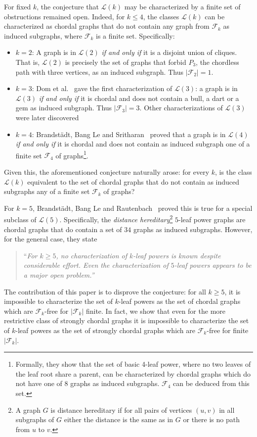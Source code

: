\documentclass[11pt,letter]{article}
\theoremstyle{remark}
\newcommand{\F}{\mathscr{F}}
\renewcommand{\L}{\mathcal{L}}
\begin{document}
For fixed $k$, the conjecture that $\L(k)$ may be characterized by a finite set of obstructions remained open. 
Indeed, for $k\le 4$, the classes $\L(k)$ can be characterized as chordal graphs that do not contain any graph from $\F_k$ as induced subgraphs, where $\F_k$ is a finite set. Specifically:
\begin{itemize}
\item $k=2$: A graph is in $\L(2)$ {\em if and only if} it is a disjoint union of cliques. That is, $\L(2)$ is precisely the set of graphs that forbid $P_3$, the chordless path with three vertices, as an induced subgraph. Thus $|\F_2|=1$.
\item $k=3$: Dom et al.~\cite{DOM2004} gave the first characterization of $\L(3)$: a graph is in $\L(3)$ {\em if and only if} it is chordal and does not contain a bull, a dart or a gem as induced subgraph. Thus $|\F_3|=3$. Other characterizations of $\L(3)$ were later discovered~\cite{BRANDSTADT2006}
\item
$k=4$: Brandst\"adt, Bang Le and Sritharan~\cite{Brandstadt2008-4LP}
proved that a graph is in $\L(4)$ {\em if and only if} it is chordal and does not contain as induced subgraph one of a finite set $\F_4$ of graphs\footnote{Formally, they show that the set of basic 4-leaf power, where no two leaves of the leaf root share a parent, can be characterized by chordal graphs which do not have one of 8 graphs as induced subgraphs. $\F_4$ can be deduced from this set.}.
\end{itemize}
Given this, the aforementioned conjecture naturally arose: for every $k$, is the class $\L(k)$ equivalent to the set of chordal graphs that do not contain as induced subgraphs any of a finite set $\F_k$ of graphs? 

For $k=5$, Brandst\"adt, Bang Le and Rautenbach~\cite{BRANDSTADT20093843} proved this is true for a special subclass of $\L(5)$. Specifically, the \emph{distance hereditary}\footnote{A graph $G$ is distance hereditary if for all pairs of vertices $(u,v)$ in all subgraphs of $G$ either the distance is the same as in $G$ or there is no path from $u$ to $v$.} $5$-leaf power graphs are chordal graphs that do contain a set of $34$ graphs as induced subgraphs.
However, for the general case, they state
\begin{quote}
    ``{\em For $k\geq 5$, no characterization of $k$-leaf powers is known despite considerable effort. Even the characterization of $5$-leaf powers appears to be a major open problem.''~\cite{BRANDSTADT20093843}} 
\end{quote}
The contribution of this paper is to disprove the conjecture: for all $k\geq 5$, it is impossible to characterize the set of $k$-leaf powers as the set of chordal graphs which are $\F_k$-free for $|\F_k|$ finite. In fact, we show that even for the more restrictive class of strongly chordal graphs it is impossible to characterize the set of $k$-leaf powers as the set of strongly chordal graphs which are $\F_k$-free for finite $|\F_k|$. 
\end{document}
